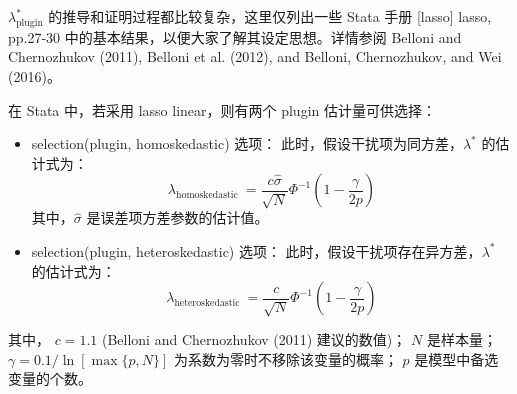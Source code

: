 
$\lambda_{\text{plugin}}^*$ 的推导和证明过程都比较复杂，这里仅列出一些 Stata 手册 [lasso] lasso, pp.27-30 
中的基本结果，以便大家了解其设定思想。详情参阅 Belloni and Chernozhukov (2011), Belloni et al. (2012), and Belloni, Chernozhukov, and Wei (2016)。



在 Stata 中，若采用 lasso linear，则有两个 plugin 估计量可供选择：
\begin{itemize}
\item selection(plugin, homoskedastic) 选项：
此时，假设干扰项为同方差，$\lambda^*$ 的估计式为：
\begin{equation}\label{eq:lasso-plugin-01}
	\lambda_{\text {homoskedastic }}=\frac{c \widehat{\sigma}}{\sqrt{N}} \Phi^{-1}\left(1-\frac{\gamma}{2 p}\right)
\end{equation}
其中，$\widehat{\sigma}$ 是误差项方差参数的估计值。
\item selection(plugin, heteroskedastic) 选项：
此时，假设干扰项存在异方差，$\lambda^*$ 的估计式为：
\begin{equation}\label{eq:lasso-plugin-02}
\lambda_{\text {heteroskedastic }}=\frac{c}{\sqrt{N}} \Phi^{-1}\left(1-\frac{\gamma}{2 p}\right)
\end{equation}
\end{itemize}
其中，
$c=1.1$ (Belloni and Chernozhukov (2011) 建议的数值)；
$N$ 是样本量；
$\gamma=0.1 / \ln [\max \{p, N\}]$ 为系数为零时不移除该变量的概率；
$p$ 是模型中备选变量的个数。







